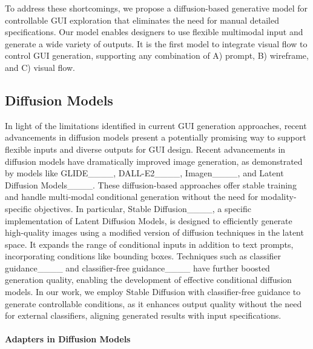 To address these shortcomings, we propose a diffusion-based generative model for controllable GUI exploration that eliminates the need for manual detailed specifications. Our model enables designers to use flexible multimodal input and generate a wide variety of outputs. It is the first model to integrate visual flow to control GUI generation, supporting any combination of A) prompt, B) wireframe, and C) visual flow.




\subsection{Diffusion Models}

In light of the limitations identified in current GUI generation approaches, recent advancements in diffusion models present a potentially promising way to support flexible inputs and diverse outputs for GUI design.
Recent advancements in diffusion models have dramatically improved image generation, as demonstrated by models like GLIDE____, DALL-E2____, Imagen____, and Latent Diffusion Models____. These diffusion-based approaches offer stable training and handle multi-modal conditional generation without the need for modality-specific objectives.
In particular, Stable Diffusion____, a specific implementation of Latent Diffusion Models,  is designed to efficiently generate high-quality images using a modified version of diffusion techniques in the latent space. It expands the range of conditional inputs in addition to text prompts, incorporating conditions like bounding boxes.
Techniques such as classifier guidance____ and classifier-free guidance____ have further boosted generation quality, enabling the development of effective conditional diffusion models. 
In our work, we employ Stable Diffusion with classifier-free guidance to generate controllable conditions, as it enhances output quality without the need for external classifiers, aligning generated results with input specifications.

\paragraph{Adapters in Diffusion Models}  

